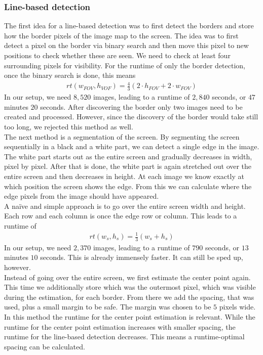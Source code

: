 \documentclass[journal,final,a4paper,twoside]{PS}
\begin{document}
\subsubsection{Line-based detection} 
\label{sec:linebased}
The first idea for a line-based detection was to first detect the borders and store how the border pixels of the image map to the screen. The idea was to first detect a pixel on the border via binary search and then move this pixel to new positions to check whether these are seen. We need to check at least four surrounding pixels for visibility.  For the runtime of only the border detection, once the binary search is done, this means 
\begin{align}
rt(w_{FOV}, h_{VOF}) = \frac{4}{3} (2 \cdot h_{FOV} + 2 \cdot w_{FOV})
\end{align}
In our setup, we need $8,520$ images, leading to a runtime of $2,840$ seconds, or $47$ minutes $20$ seconds.  After discovering the border only two images need to be created and processed. However, since the discovery of the border would take still too long, we rejected this method as well.\\
The next method is a segmentation of the screen. By segmenting the screen sequentially in a black and a white part, we can detect a single edge in the image. The white part starts out as the entire screen and gradually decreases in width, pixel by pixel. After that is done, the white part is again stretched out over the entire screen and then decreases in height. At each image we know exactly at which position the screen shows the edge. From this we can calculate where the edge pixels from the image should have appeared.\\
A naïve and simple approach is to go over the entire screen width and height. Each row and each column is once the edge row or column. This leads to a runtime of
\begin{align}
rt(w_s, h_s) = \frac{1}{3} (w_s + h_s)
\end{align}
In our setup, we need $2,370$ images, leading to a runtime of $790$ seconds, or $13$ minutes $10$ seconds.  This is already immensely faster. It can still be sped up, however.\\
Instead of going over the entire screen, we first estimate the center point again. This time we additionally store which was the outermost pixel, which was visible during the estimation, for each border. From there we add the spacing, that was used, plus a small margin to be safe. The margin was chosen to be $5$ pixels wide. In this method the runtime for the center point estimation is relevant. While the runtime for the center point estimation increases with smaller spacing, the runtime for the line-based detection decreases. This means a runtime-optimal spacing can be calculated.\\
\end{document}
